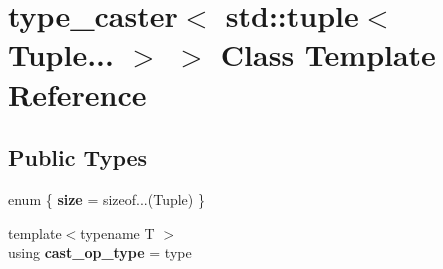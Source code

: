 \hypertarget{classtype__caster_3_01std_1_1tuple_3_01_tuple_8_8_8_01_4_01_4}{}\section{type\+\_\+caster$<$ std\+:\+:tuple$<$ Tuple... $>$ $>$ Class Template Reference}
\label{classtype__caster_3_01std_1_1tuple_3_01_tuple_8_8_8_01_4_01_4}
\subsection*{Public Types}
\begin{DoxyCompactItemize}
\item 
enum \{ {\bfseries size} = sizeof...(Tuple)
 \}\hypertarget{classtype__caster_3_01std_1_1tuple_3_01_tuple_8_8_8_01_4_01_4_a221f5902ac3455fb82e756f5c287afea}{}\label{classtype__caster_3_01std_1_1tuple_3_01_tuple_8_8_8_01_4_01_4_a221f5902ac3455fb82e756f5c287afea}

\item 
{\footnotesize template$<$typename T $>$ }\\using {\bfseries cast\+\_\+op\+\_\+type} = type\hypertarget{classtype__caster_3_01std_1_1tuple_3_01_tuple_8_8_8_01_4_01_4_a486c9e4adcddc15aba2ed18c1ac9d037}{}\label{classtype__caster_3_01std_1_1tuple_3_01_tuple_8_8_8_01_4_01_4_a486c9e4adcddc15aba2ed18c1ac9d037}

\end{DoxyCompactItemize}

